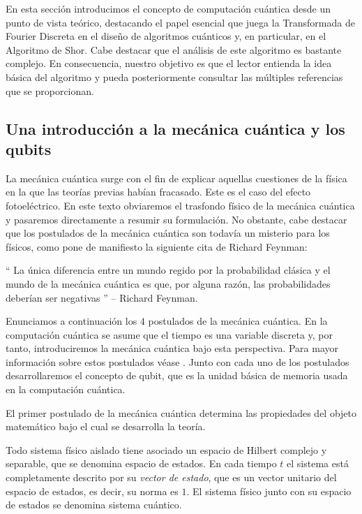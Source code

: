 \documentclass{article}
\begin{document}
En esta sección introducimos el concepto de computación cuántica desde un punto de vista teórico, destacando el papel esencial que juega la Transformada de Fourier Discreta en el diseño de algoritmos cuánticos y, en particular, en el Algoritmo de Shor. Cabe destacar que el análisis de este algoritmo es bastante complejo. En consecuencia, nuestro objetivo es que el lector entienda la idea básica del algoritmo y pueda posteriormente consultar las múltiples referencias que se proporcionan.

\subsection{Una introducción a la mecánica cuántica y los qubits} \label{sec:qc:intro}

La mecánica cuántica surge con el fin de explicar aquellas cuestiones de la física en la que las teorías previas habían fracasado. Este es el caso del efecto fotoeléctrico. En este texto obviaremos el trasfondo físico de la mecánica cuántica y pasaremos directamente a resumir su formulación. No obstante, cabe destacar que los postulados de la mecánica cuántica son todavía un misterio para los físicos, como pone de manifiesto la siguiente cita de Richard Feynman:

`` La única diferencia entre un mundo regido por la probabilidad clásica y el mundo de la mecánica cuántica es que, por alguna razón, las probabilidades deberían ser negativas \cite{feynman}'' -- Richard Feynman. %

Enunciamos a continuación los $4$ postulados de la mecánica cuántica. En la computación cuántica se asume que el tiempo es una variable discreta y, por tanto, introduciremos la mecánica cuántica bajo esta perspectiva. 
Para mayor información sobre estos postulados véase \cite[Capítulo 2]{nielsen}. Junto con cada uno de los postulados desarrollaremos el concepto de qubit, que es la unidad básica de memoria usada en la computación cuántica.

El primer postulado de la mecánica cuántica determina las propiedades del objeto matemático bajo el cual se desarrolla la teoría.

\begin{postulate} \label{post:1}
 Todo sistema físico aislado tiene asociado un espacio de Hilbert complejo y separable, que se denomina espacio de estados. En cada tiempo $t$ el sistema está completamente descrito por su \emph{vector de estado}, que es un vector unitario del espacio de estados, es decir, su norma es $1$. El sistema físico junto con su espacio de estados se denomina sistema cuántico.
\end{postulate}
\end{document}

